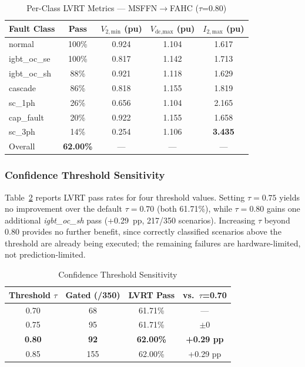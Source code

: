 \begin{table}[htbp]
\caption{Per-Class LVRT Metrics — MSFFN$\rightarrow$FAHC ($\tau$=0.80)}
\label{tab:lvrt_class}
\centering
\begin{tabular}{lcccc}
\hline
Fault Class & Pass & $V_{2,\text{min}}$ (pu) & $V_\text{dc,max}$ (pu) & $I_{2,\text{max}}$ (pu) \\
\hline
normal       & 100\% & 0.924 & 1.104 & 1.617 \\
igbt\_oc\_se & 100\% & 0.817 & 1.142 & 1.713 \\
igbt\_oc\_sh & 88\%  & 0.921 & 1.118 & 1.629 \\
cascade      & 86\%  & 0.818 & 1.155 & 1.819 \\
sc\_1ph      & 26\%  & 0.656 & 1.104 & 2.165 \\
cap\_fault   & 20\%  & 0.922 & 1.155 & 1.658 \\
sc\_3ph      & 14\%  & 0.254 & 1.106 & \textbf{3.435} \\
\hline
Overall      & \textbf{62.00\%} & — & — & — \\
\hline
\end{tabular}
\end{table}

\subsubsection{Confidence Threshold Sensitivity}

Table~\ref{tab:threshold} reports LVRT pass rates for
four threshold values.
Setting $\tau{=}0.75$ yields no improvement over the default
$\tau{=}0.70$ (both 61.71\%),
while $\tau{=}0.80$ gains one additional
\textit{igbt\_oc\_sh} pass (+0.29~pp, 217/350 scenarios).
Increasing $\tau$ beyond 0.80 provides no further benefit,
since correctly classified scenarios above the threshold
are already being executed; the remaining failures
are hardware-limited, not prediction-limited.

\begin{table}[htbp]
\caption{Confidence Threshold Sensitivity}
\label{tab:threshold}
\centering
\begin{tabular}{cccc}
\hline
Threshold $\tau$ & Gated (/350) & LVRT Pass & vs.\ $\tau$=0.70 \\
\hline
0.70 & 68  & 61.71\% & — \\
0.75 & 95  & 61.71\% & $\pm$0 \\
\textbf{0.80} & \textbf{92}  & \textbf{62.00\%} & \textbf{+0.29 pp} \\
0.85 & 155 & 62.00\% & +0.29 pp \\
\hline
\end{tabular}
\end{table}

